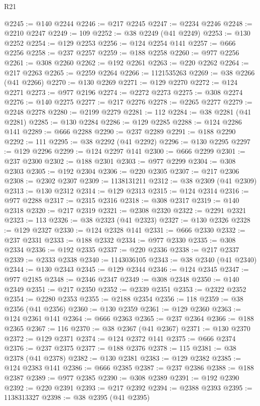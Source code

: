 \begin{lexlean}{R21}
\begin{coremodule}
@2245 := @140 @2244
@2246 := @217 @2245
@2247 := @2234 @2246
@2248 := @2210 @2247
@2249 := 109
@2252 := @38 @2249 (@41 @2249)
@2253 := @130 @2252
@2254 := @129 @2253
@2256 := @124 @2254 @141
@2257 := @666 @2256
@2258 := @237 @2257
@2259 := @188 @2258
@2260 := @977 @2256
@2261 := @308 @2260
@2262 := @192 @2261
@2263 := @220 @2262
@2264 := @217 @2263
@2265 := @2259 @2264
@2266 := 1121535263
@2269 := @38 @2266 (@41 @2266)
@2270 := @130 @2269
@2271 := @129 @2270
@2272 := @124 @2271
@2273 := @977 @2196
@2274 := @2272 @2273
@2275 := @308 @2274
@2276 := @140 @2275
@2277 := @217 @2276
@2278 := @2265 @2277
@2279 := @2248 @2278
@2280 := @2199 @2279
@2281 := 112
@2284 := @38 @2281 (@41 @2281)
@2285 := @130 @2284
@2286 := @129 @2285
@2288 := @124 @2286 @141
@2289 := @666 @2288
@2290 := @237 @2289
@2291 := @188 @2290
@2292 := 111
@2295 := @38 @2292 (@41 @2292)
@2296 := @130 @2295
@2297 := @129 @2296
@2299 := @124 @2297 @141
@2300 := @666 @2299
@2301 := @237 @2300
@2302 := @188 @2301
@2303 := @977 @2299
@2304 := @308 @2303
@2305 := @192 @2304
@2306 := @220 @2305
@2307 := @217 @2306
@2308 := @2302 @2307
@2309 := 1138131211
@2312 := @38 @2309 (@41 @2309)
@2313 := @130 @2312
@2314 := @129 @2313
@2315 := @124 @2314
@2316 := @977 @2288
@2317 := @2315 @2316
@2318 := @308 @2317
@2319 := @140 @2318
@2320 := @217 @2319
@2321 := @2308 @2320
@2322 := @2291 @2321
@2323 := 113
@2326 := @38 @2323 (@41 @2323)
@2327 := @130 @2326
@2328 := @129 @2327
@2330 := @124 @2328 @141
@2331 := @666 @2330
@2332 := @237 @2331
@2333 := @188 @2332
@2334 := @977 @2330
@2335 := @308 @2334
@2336 := @192 @2335
@2337 := @220 @2336
@2338 := @217 @2337
@2339 := @2333 @2338
@2340 := 1143036105
@2343 := @38 @2340 (@41 @2340)
@2344 := @130 @2343
@2345 := @129 @2344
@2346 := @124 @2345
@2347 := @977 @2185
@2348 := @2346 @2347
@2349 := @308 @2348
@2350 := @140 @2349
@2351 := @217 @2350
@2352 := @2339 @2351
@2353 := @2322 @2352
@2354 := @2280 @2353
@2355 := @2188 @2354
@2356 := 118
@2359 := @38 @2356 (@41 @2356)
@2360 := @130 @2359
@2361 := @129 @2360
@2363 := @124 @2361 @141
@2364 := @666 @2363
@2365 := @237 @2364
@2366 := @188 @2365
@2367 := 116
@2370 := @38 @2367 (@41 @2367)
@2371 := @130 @2370
@2372 := @129 @2371
@2374 := @124 @2372 @141
@2375 := @666 @2374
@2376 := @237 @2375
@2377 := @188 @2376
@2378 := 115
@2381 := @38 @2378 (@41 @2378)
@2382 := @130 @2381
@2383 := @129 @2382
@2385 := @124 @2383 @141
@2386 := @666 @2385
@2387 := @237 @2386
@2388 := @188 @2387
@2389 := @977 @2385
@2390 := @308 @2389
@2391 := @192 @2390
@2392 := @220 @2391
@2393 := @217 @2392
@2394 := @2388 @2393
@2395 := 1138313327
@2398 := @38 @2395 (@41 @2395)

\end{coremodule}
\end{lexlean}
